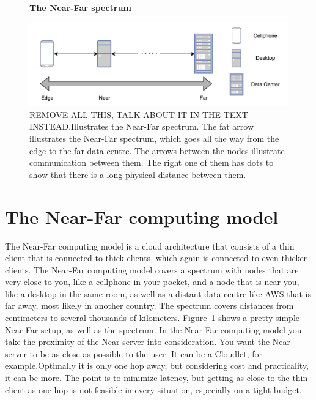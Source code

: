 
\begin{figure}[t]
    \centering
    \textbf{The Near-Far spectrum}\par\medskip
    \includegraphics[scale=0.6]{chapters/background/figures/Near-far-spectrum.png}
    \caption{REMOVE ALL THIS, TALK ABOUT IT IN THE TEXT INSTEAD.Illustrates the Near-Far spectrum. The fat arrow illustrates the Near-Far spectrum, which goes all the way from the edge to the far data centre.  The arrows between the nodes illustrate communication between them. The right one of them has dots to show that there is a long physical distance between them.}
    \label{fig:nearFarSimple}
\end{figure}

\section{The Near-Far computing model}
The Near-Far computing model is a cloud architecture that consists of a thin client that is connected to thick clients, which again is connected to even thicker clients. The Near-Far computing model covers a spectrum with nodes that are very close to you, like a cellphone in your pocket, and a node that is near you, like a desktop in the same room, as well as a distant data centre like AWS that is far away, most likely in another country. The spectrum covers distances from centimeters to several thousands of kilometers. Figure~\ref{fig:nearFarSimple} shows a pretty simple Near-Far setup, as well as the spectrum. In the Near-Far computing model you take the proximity of the Near server into consideration. You want the Near server to be as close as possible to the user. It can be a Cloudlet, for example.Optimally it is only one hop away, but considering cost and practicality, it can be more. The point is to minimize latency, but getting as close to the thin client as one hop is not feasible in every situation, especially on a tight budget.


